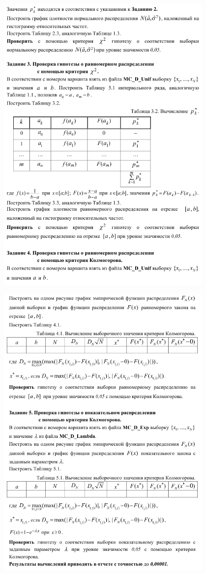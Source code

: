 \begin{figure}[p]%
\centering%
\includegraphics[width=0.95\textwidth]{../latex/inc/generated/img/task3.png}%
\end{figure}
\clearpage

\begin{figure}[p]%
\centering%
\includegraphics[width=0.95\textwidth]{../latex/inc/generated/img/task4.png}%
\end{figure}
\clearpage
